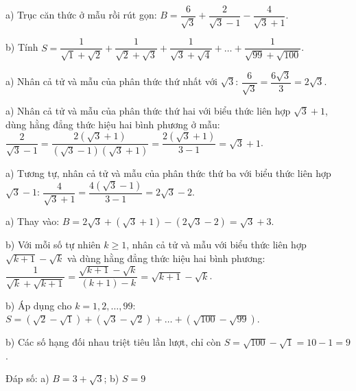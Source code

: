 \begin{problem}[9DS-CAN-005]
a) Trục căn thức ở mẫu rồi rút gọn: $B = \dfrac{6}{\sqrt{3}} + \dfrac{2}{\sqrt{3} - 1} - \dfrac{4}{\sqrt{3} + 1}$.

b) Tính $S = \dfrac{1}{\sqrt{1} + \sqrt{2}} + \dfrac{1}{\sqrt{2} + \sqrt{3}} + \dfrac{1}{\sqrt{3} + \sqrt{4}} + \dots + \dfrac{1}{\sqrt{99} + \sqrt{100}}$.

\begin{solution}
a) Nhân cả tử và mẫu của phân thức thứ nhất với $\sqrt{3}$: $\dfrac{6}{\sqrt{3}} = \dfrac{6\sqrt{3}}{3} = 2\sqrt{3}$.

a) Nhân cả tử và mẫu của phân thức thứ hai với biểu thức liên hợp $\sqrt{3} + 1$, dùng hằng đẳng thức hiệu hai bình phương ở mẫu: $\dfrac{2}{\sqrt{3} - 1} = \dfrac{2(\sqrt{3} + 1)}{(\sqrt{3} - 1)(\sqrt{3} + 1)} = \dfrac{2(\sqrt{3} + 1)}{3 - 1} = \sqrt{3} + 1$.

a) Tương tự, nhân cả tử và mẫu của phân thức thứ ba với biểu thức liên hợp $\sqrt{3} - 1$: $\dfrac{4}{\sqrt{3} + 1} = \dfrac{4(\sqrt{3} - 1)}{3 - 1} = 2\sqrt{3} - 2$.

a) Thay vào: $B = 2\sqrt{3} + (\sqrt{3} + 1) - (2\sqrt{3} - 2) = \sqrt{3} + 3$.

b) Với mỗi số tự nhiên $k \geq 1$, nhân cả tử và mẫu với biểu thức liên hợp $\sqrt{k + 1} - \sqrt{k}$ và dùng hằng đẳng thức hiệu hai bình phương: $\dfrac{1}{\sqrt{k} + \sqrt{k + 1}} = \dfrac{\sqrt{k + 1} - \sqrt{k}}{(k + 1) - k} = \sqrt{k + 1} - \sqrt{k}$.

b) Áp dụng cho $k = 1, 2, \dots, 99$: $S = (\sqrt{2} - \sqrt{1}) + (\sqrt{3} - \sqrt{2}) + \dots + (\sqrt{100} - \sqrt{99})$.

b) Các số hạng đối nhau triệt tiêu lần lượt, chỉ còn $S = \sqrt{100} - \sqrt{1} = 10 - 1 = 9$.

Đáp số: a) $\boxed{B = 3 + \sqrt{3}}$; b) $\boxed{S = 9}$
\end{solution}
\end{problem}

